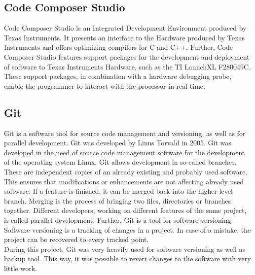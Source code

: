  
\subsection{Code Composer Studio}
Code Composer Studio is an Integrated Development Environment produced by Texas Instruments. It presents an interface to the Hardware produced by Texas Instruments and offers optimizing compilers for C and C++. Further, Code Composer Studio features support packages for the development and deployment of software to Texas Instruments Hardware, such as the TI LaunchXL F280049C. These support packages, in combination with a hardware debugging probe, enable the programmer to interact with the processor in real time.\cite{Instruments2022}
 
 
\subsection{Git}
Git is a software tool for source code management and versioning, as well as for parallel development. Git was developed by Linus Torvald in 2005. Git was developed in the need of source code management software for the development of the operating system Linux. Git allows development in so-called branches. These are independent copies of an already existing and probably used software. This ensures that modifications or enhancements are not affecting already used software. If a feature is finished, it can be merged back into the higher-level branch. Merging is the process of bringing two files, directories or branches together. Different developers, working on different features of the same project, is called parallel development. Further, Git is a tool for software versioning. Software versioning is a tracking of changes in a project. In case of a mistake, the project can be recovered to every tracked point.\\
During this project, Git was very heavily used for software versioning as well as backup tool. This way, it was possible to revert changes to the software with very little work.
 
 

